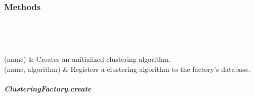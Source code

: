 \documentclass[letterpaper,10pt,english]{sphinxmanual}
\begin{document}
\begin{fulllineitems}
\begin{savenotes}
\begin{longtable}[c]{}
\endlastfoot

\end{longtable}\sphinxatlongtableend\end{savenotes}
\subsubsection*{Methods}


\begin{savenotes}\sphinxatlongtablestart\begin{longtable}[c]{}
\hline

\endfirsthead

%
{}\\
\hline

\endhead

\hline
{}\\
\endfoot

\endlastfoot

{\hyperref[\detokenize{api/generated/directional_clustering.clustering.ClusteringFactory.create:directional_clustering.clustering.ClusteringFactory.create}]{}}(name)
&
Creates an unitialized clustering algorithm.
\\
\hline
{\hyperref[\detokenize{api/generated/directional_clustering.clustering.ClusteringFactory.register:directional_clustering.clustering.ClusteringFactory.register}]{}}(name, algorithm)
&
Registers a clustering algorithm to the factory’s database.
\\
\hline
\end{longtable}\sphinxatlongtableend\end{savenotes}


\subparagraph{ClusteringFactory.create}
\label{\detokenize{api/generated/directional_clustering.clustering.ClusteringFactory.create:clusteringfactory-create}}\label{\detokenize{api/generated/directional_clustering.clustering.ClusteringFactory.create::doc}}


\end{fulllineitems}
\end{document}
